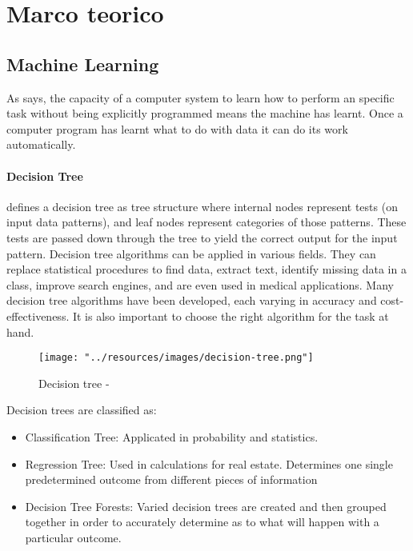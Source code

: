 \section{Marco teorico}
%
%
%

\subsection{Machine Learning}

As \textcite{mahesh2020machine} says, the capacity of a computer system to learn how to perform an specific task without being explicitly programmed means the machine has learnt. Once a computer program has learnt what to do with data it can do its work automatically.

\paragraph {Decision Tree}

\textcite{navada2011overview} defines a decision tree as tree structure where internal nodes represent tests (on input data patterns), and leaf nodes represent categories of those patterns. These tests are passed down through the tree to yield the correct output for the input pattern. Decision tree algorithms can be applied in various fields. They can replace statistical procedures to find data, extract text, identify missing data in a class, improve search engines, and are even used in medical applications. Many decision tree algorithms have been developed, each varying in accuracy and cost-effectiveness. It is also important to choose the right algorithm for the task at hand.

\begin{figure}[H]
    \centering
    \texttt{[image: "../resources/images/decision-tree.png"]}
    \caption{Decision tree - \textcite{mahesh2020machine}}
    \label{fig:image}
\end{figure}

Decision trees are classified as:
\begin{itemize}
    \item Classification Tree: Applicated in probability and statistics.
    \item Regression Tree: Used in calculations for real estate. Determines one single predetermined outcome from different pieces of information
    \item Decision Tree Forests: Varied decision trees are created and then grouped together in order to accurately determine as to what will happen with a particular outcome.
\end{itemize}

